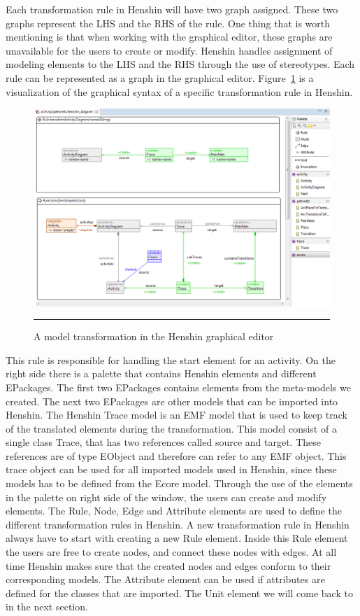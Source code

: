 Each transformation rule in Henshin will have two graph assigned.
These two graphs represent the LHS and the RHS of the rule. One thing that is worth mentioning is
that when working with the graphical editor, these graphs are unavailable for
the users to create or modify. Henshin handles assignment of modeling elements
to the LHS and the RHS through the use of stereotypes. Each rule can be
represented as a graph in the graphical editor. Figure~\ref{fig:HenshinScreen}
is a visualization of the graphical syntax of a specific transformation rule in
Henshin.

\begin{figure}[H]
	\centering
	\includegraphics[scale=0.5]{figures/henshin_scren_2}
	\rule{35em}{0.5pt}
	\caption[The Henshin graphical editor]
	{A model transformation in the Henshin graphical editor}
	\label{fig:HenshinScreen}
\end{figure}

This rule is responsible for handling the start element for an activity.
On the right side there is a palette that contains Henshin elements and
different EPackages. The first two EPackages contains elements from the
meta-models we created. The next two EPackages are other models that can
be imported into Henshin. The Henshin Trace model is an EMF model that is used
to keep track of the translated elements during the transformation. This model
consist of a single class Trace, that has two references called source and
target. These references are of type EObject and therefore can refer to any EMF
object. This trace object can be used for all imported models used
in Henshin, since these models has to be defined from the Ecore model. Through
the use of the elements in the palette on right side of the window, the users
can create and modify elements. 
The Rule, Node, Edge and Attribute elements are used to define the different
transformation rules in Henshin. A new transformation rule in Henshin always
have to start with creating a new Rule element. Inside this Rule element the
users are free to create nodes, and connect these nodes with edges. At
all time Henshin makes sure that the created nodes and edges conform to their
corresponding models. The Attribute element can be used if attributes are
defined for the classes that are imported. The Unit element we will come back to
in the next section.

